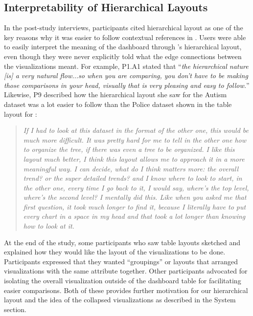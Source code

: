 \subsection{Interpretability of Hierarchical Layouts}
\par In the post-study interviews,  participants cited hierarchical layout as one of the key reasons why it was easier to follow contextual references in \system. Users were able to easily interpret the meaning of the dashboard through \system's hierarchical layout, even though they were never explicitly told what the edge connections between the visualizations meant. For example, P1.A1 stated that ``\textit{the hierarchical nature [is] a very natural flow...so when you are comparing, you don't have to be making those comparisons in your head, visually that is very pleasing and easy to follow.}'' %
Likewise, P9 described how the hierarchical layout she saw for the Autism dataset was a lot easier to follow than the Police dataset shown in the table layout for \cluster:
\begin{quote}
\textit{If I had to look at this dataset in the format of the other one, this would be much more difficult. It was pretty hard for me to tell in the other one how to organize the tree, if there was even a tree to be organized. I like this layout much better, I think this layout allows me to approach it in a more meaningful way. I can decide, what do I think matters more: the overall trend? or the super detailed trends? and I know where to look to start, in the other one, every time I go back to it, I would say, where's the top level, where's the second level? I mentally did this. Like when you asked me that first question, it took much longer to find it, because I literally have to put every chart in a space in my head and that took a lot longer than knowing how to look at it.}
\end{quote}
At the end of the study, some participants who saw table layouts sketched and explained how they would like the layout of the visualizations to be done. Participants expressed that they wanted ``groupings'' or layouts that arranged visualizations with the same attribute together. Other participants advocated for isolating the overall visualization outside of the dashboard table for facilitating easier comparisons. Both of these provides further motivation for our hierarchical layout and the idea of the collapsed visualizations as described in the System section.%
